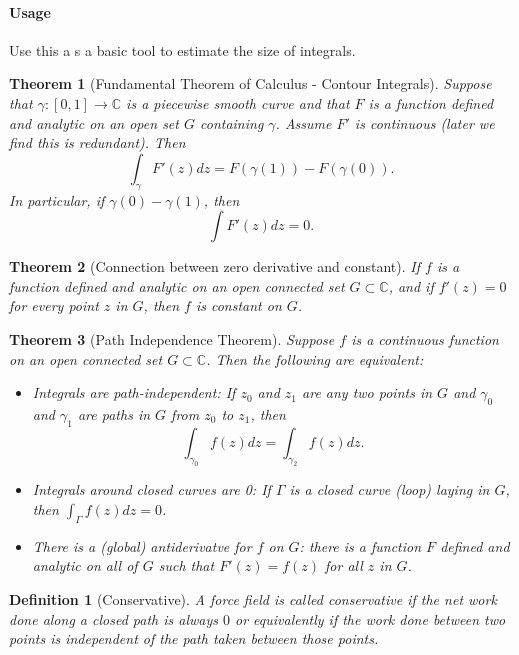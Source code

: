 \documentclass[a4paper]{article}
\newtheorem{definition}{Definition}
\newtheorem{theorem}{Theorem}
\newcommand{\C}{\mathbb{C}}
\begin{document}
\paragraph{Usage}
Use this a s a basic tool to estimate the size of integrals. 


\begin{theorem}[Fundamental Theorem of Calculus - Contour Integrals]
  Suppose that $\gamma : [0, 1] \to \C$ is a piecewise smooth curve and that $F$ is a function defined and analytic on an open set $G$ containing $\gamma$. Assume $F'$ is continuous (later we find this is redundant). Then 
  \[
    \int_\gamma F'(z) dz = F(\gamma(1)) - F(\gamma(0)).
  \]
  In particular, if $\gamma(0) - \gamma(1)$, then 
  \[
    \int F'(z)dz = 0.
  \]
\end{theorem}

\begin{theorem}[Connection between zero derivative and constant]
If $f$ is a function defined and analytic on an open connected set $G \subset \C$, and if $f'(z) = 0$ for every point $z$ in $G$, then $f$ is constant on $G$. 
\end{theorem}


\begin{theorem}[Path Independence Theorem]
  Suppose $f$ is a continuous function on an open connected set $G \subset \C$.
  Then the following are equivalent: 
  \begin{itemize}
    \item Integrals are path-independent: If $z_0$ and $z_1$ are any two points in $G$ and $\gamma_0$ and $\gamma_1$ are paths in $G$ from $z_0$ to $z_1$, then 
      \[
        \int_{\gamma_0} f(z) dz = \int_{\gamma_2} f(z) dz.
      \]
    \item Integrals around closed curves are 0: If $\Gamma$ is a closed curve (loop) laying in $G$, then $\int_\Gamma f(z) dz = 0$.
    \item There is a (global) antiderivatve for $f$ on $G$: there is a function $F$ defined and analytic on all of $G$ such that $F'(z) = f(z)$ for all $z$ in $G$. 
  \end{itemize}
\end{theorem}

\begin{definition}[Conservative]
  A force field is called conservative if the net work done along a closed path is always $0$ or equivalently if the work done between two points is independent of the path taken between those points. 
\end{definition}
\end{document}

